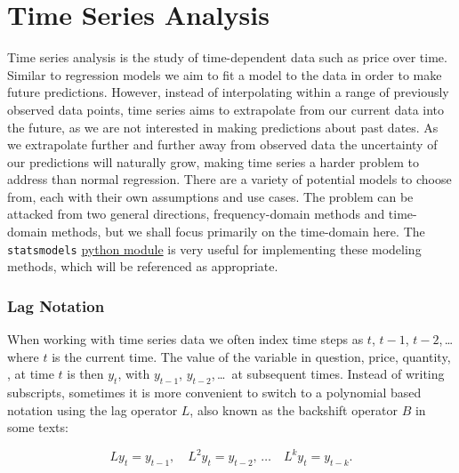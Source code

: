 \section{Time Series Analysis}
\label{additional:time_series}

Time series analysis is the study of time-dependent data such as price over time.
Similar to regression models we aim to fit a model
to the data in order to make future predictions.
However, instead of interpolating within a range of previously observed data points,
time series aims to extrapolate from our current data into the future,
as we are not interested in making predictions about past dates.
As we extrapolate further and further away from observed data
the uncertainty of our predictions will naturally grow,
making time series a harder problem to address than normal regression.
There are a variety of potential models to choose from,
each with their own assumptions and use cases.
The problem can be attacked from two general directions,
frequency-domain methods and time-domain methods,
but we shall focus primarily on the time-domain here.
The \texttt{statsmodels} \href{https://www.statsmodels.org}{python module}
is very useful for implementing these modeling methods,
which will be referenced as appropriate.

\subsubsection{Lag Notation}
\label{additional:time_series:L}

When working with time series data we often index time steps as $t$, $t-1$, $t-2$,\,\ldots\,
where $t$ is the current time.
The value of the variable in question, price, quantity, \etc,
at time $t$ is then $y_{t}$, with $y_{t-1}$, $y_{t-2}$,\,\ldots\, at subsequent times.
Instead of writing subscripts, sometimes it is more convenient
to switch to a polynomial based notation using
the lag operator $L$, also known as the backshift operator $B$ in some texts:

\begin{equation}\label{eq:time_series:L}
L y_{t} = y_{t-1},\quad L^{2} y_{t} = y_{t-2},\,\ldots \quad L^{k} y_{t} = y_{t-k}.
\end{equation}

